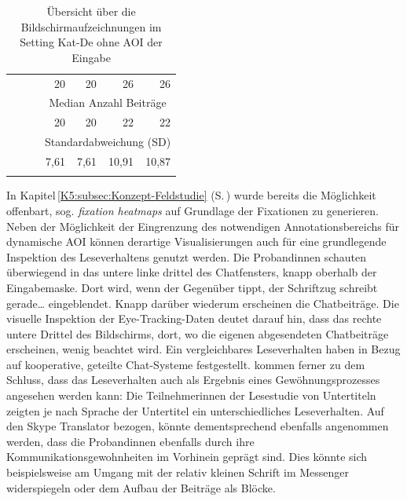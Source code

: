 \begin{table}
{\begin{tabular}{lcrrrrr}
        \multicolumn{3}{c}{} & 20 & 20 & 26 & 26 \\\cmidrule(lr){4-7}
              \multicolumn{3}{c}{} & \multicolumn{4}{c}{{Median Anzahl Beiträge}} \\ 
              \multicolumn{3}{c}{} & 20 & 20 & 22 & 22 \\\cmidrule(lr){4-7}
              \multicolumn{3}{c}{} & \multicolumn{4}{c}{{Standardabweichung (SD)}} \\
              \multicolumn{3}{c}{} & 7,61 & 7,61 & 10,91 & 10,87 \\\lspbottomrule
         \end{tabular}}
         \caption[Übersicht Bildschirmaufzeichnungen]
                 {Übersicht über die Bildschirmaufzeichnungen im Setting Kat-De ohne AOI der Eingabe\label{K6:tab:Werte-ScreenCap-CatDe}}
\end{table}
       
       



In Kapitel\,\ref{K5:subsec:Konzept-Feldstudie} (S.\,\pageref{K5:fig:Heatmap-TN24}\label{K6:subsub:fixheatmap-catde-begutachtung}) wurde bereits die Möglichkeit offenbart, sog. \emph{fixation heatmaps} auf Grundlage der Fixationen zu generieren. Neben der Möglichkeit der Eingrenzung des notwendigen Annotationsbereichs für dynamische AOI können derartige Visualisierungen auch für eine grundlegende Inspektion des Leseverhaltens genutzt werden. Die Proband{\textperiodcentered}innen schauten überwiegend in das untere linke drittel des Chatfensters, knapp oberhalb der Eingabemaske. Dort wird, wenn der Gegenüber tippt, der Schriftzug \glqq schreibt gerade\dots\grqq{} eingeblendet. Knapp darüber wiederum erscheinen die Chatbeiträge. Die visuelle Inspektion der Eye-Tracking-Daten deutet darauf hin, dass das rechte untere Drittel des Bildschirms, dort, wo die eigenen abgesendeten Chatbeiträge erscheinen, wenig beachtet wird. Ein vergleichbares Leseverhalten haben \citet[4]{schlosser_beyond_2018} in Bezug auf kooperative, geteilte Chat-Systeme festgestellt. \citet[413]{bisson_processing_2014} kommen ferner zu dem Schluss, dass das Leseverhalten auch als Ergebnis eines Gewöhnungsprozesses angesehen werden kann: Die Teilnehmer{\textperiodcentered}innen der Lesestudie von Untertiteln zeigten je nach Sprache der Untertitel ein unterschiedliches Leseverhalten. Auf den Skype Translator bezogen, könnte dementsprechend ebenfalls angenommen werden, dass die Proband{\textperiodcentered}innen ebenfalls durch ihre Kommunikationsgewohnheiten im Vorhinein geprägt sind. Dies könnte sich beispielsweise am Umgang mit der relativ kleinen Schrift im Messenger widerspiegeln oder dem Aufbau der Beiträge als Blöcke.

